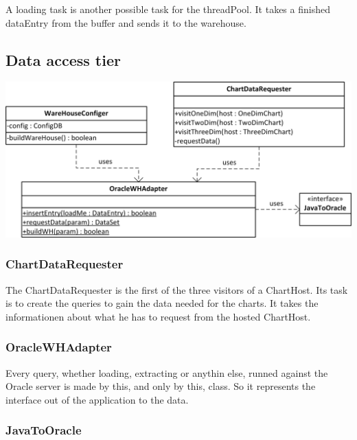 A loading task is another possible task for the threadPool. It takes a finished dataEntry from the buffer and sends it to the warehouse.




\subsection{Data access tier}

\begin{center}
\includegraphics{Pictures/Parts/Data.png}
\end{center} 

\subsubsection*{ChartDataRequester}

The ChartDataRequester is the first of the three visitors of a ChartHost. Its task is to 
create the queries to gain the data needed for the charts. It takes the informationen about what he
has to request from the hosted ChartHost.



\subsubsection*{OracleWHAdapter}

Every query, whether loading, extracting or anythin else, runned against the Oracle server is made by this,
and only by this, class. So it represents the interface out of the application to the data.



\subsubsection*{JavaToOracle}

